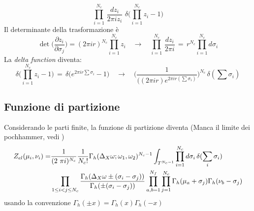 \documentclass[a4paper,12pt]{article}
\begin{document}
$$
\prod_{i=1}^{N_c} \, \frac{dz_i}{2 \pi i z_i} \, \, \delta \big( \prod_{i=1}^{N_c} z_i - 1 \big)
$$ 
Il determinante della trasformazione è
$$
  \det \big (\frac{ \partial z_i }{ \partial \sigma_j})= (2 \pi i r)^{N_c} \prod_{i=1}^{N_c}  z_i \quad \longrightarrow \quad \prod_{i=1}^{N_c} \, \frac{dz_i}{2 \pi i} \, = \, r^{N_c} \prod_{i=1}^{N_c} d \sigma_i
$$
La \emph{delta function} diventa:
\begin{equation}
\delta \big( \prod_{i=1}^{N_c} z_i - 1 \big) \, = \, \delta \big(e^{2 \pi i r \sum \sigma_i} - 1 \big) \quad \longrightarrow \quad  \bigg( \frac{1}{ ((2 \pi i r) e^{2 \pi i r (\sum \sigma_i)}} \bigg)^{N_c} \, \delta ( \sum \sigma_i)
 \end{equation}
\begin{comment}
		 Si può capire il risultato della delta function come un ulteriore cambio di variabile fra le $\sigma_i$:
 	\begin{align*}
 	 \sigma_i \rightarrow \tilde{\sigma_i} \qquad \mbox{per} \qquad i= 1 \ldots N-1 \qquad \sigma_N \rightarrow \tilde{\sigma_N} = S = \sum_{i=1}^{N} \sigma_i \\
 	  Det(J) = Det \bigg( \frac{\partial \sigma_i}{\partial \tilde{\sigma_j} } \bigg) \; = \; 
 	   \begin{pmatrix}[c c c  c|c]
			1 	& 0 		& 0 & \cdots & 0 \\
			0 			 & 1 & 0 & \cdots &  \vdots \\
			\vdots 		& 0 		& \ddots & 0 & \vdots \\
			\vdots & \vdots & 0 & 1 & 0 \\
			\hline 
			1 & \cdots & \cdots & 1  &1 \\
	\end{pmatrix} 
	\end{align*}
\end{comment}

\subsection{Funzione di partizione}
Considerando le parti finite, la funzione di partizione diventa
(Manca il limite dei pochhammer, vedi \citep{Spiridonov:2009za})
\begin{align*}
Z_{el} ( \mu_i , \nu_i ) = &
 \frac{1}{ (2 \ \pi i)^{N_c} }{1 \over N_c ! } 
\Gamma_h ( \Delta_X \omega ; \omega_1 , \omega_2)^{N_c-1}
\int_{T^{N_c-1}}  
\prod_{i=1}^{N_c} d \sigma_i \, \delta( \sum_i \sigma_i) \, \\
 &  \prod_{ 1 \leq i<j \leq N_c} \frac{ \Gamma_h( \Delta_X \omega \pm (\sigma_i - \sigma_j)) }{ \Gamma_h ( \pm (\sigma_i - \sigma_j) )} 
 \prod_{a,b=1}^{N_f} \prod_{j=1}^{N_c} \Gamma_h ( \mu_a + \sigma_j) \Gamma_h ( \nu_b - \sigma_j)
\end{align*}
usando la convenzione $ \Gamma_h ( \pm x ) = \Gamma_h (x) \Gamma_h( -x)$
\end{document}
